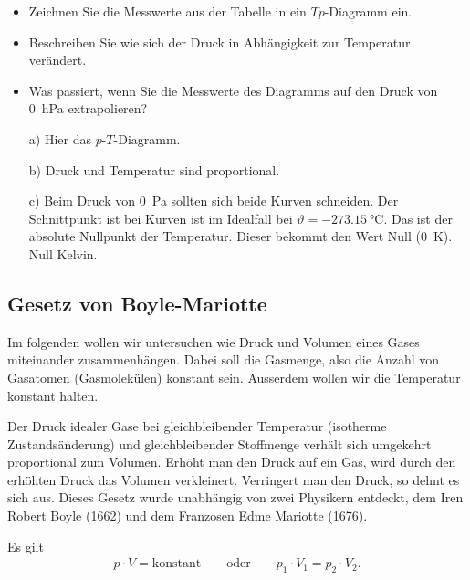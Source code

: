 \documentclass[12pt,a4paper,twoside]{article}
\begin{document}
\begin{aufgabe}
\begin{itemize}
\item Zeichnen Sie die Messwerte aus der Tabelle in ein $Tp$-Diagramm ein.
\item Beschreiben Sie wie sich der Druck in Abhängigkeit zur Temperatur verändert.
\item Was passiert, wenn Sie die Messwerte des Diagramms auf den Druck von \SI{0}{hPa} extrapolieren?
\end{itemize}
\begin{loesung}
	\begin{itemize}
		\item [a)] Hier das $p$-$T$-Diagramm.\par
	
\item [b)] Druck und Temperatur sind proportional.
\item [c)] Beim Druck von \SI{0}{Pa} sollten sich beide Kurven schneiden. Der Schnittpunkt ist bei Kurven ist im 
	Idealfall bei $\vartheta=\SI{-273.15}{\celsius}$. Das ist der absolute Nullpunkt der Temperatur. Dieser bekommt den Wert Null (\SI{0}{K}).
	Null Kelvin.
	\end{itemize}
\end{loesung}
\end{aufgabe}


\subsection*{Gesetz von Boyle-Mariotte}
Im folgenden wollen wir untersuchen wie Druck und Volumen eines Gases miteinander zusammenhängen.
Dabei soll die Gasmenge, also die Anzahl von Gasatomen (Gasmolekülen) konstant sein.
Ausserdem wollen wir die Temperatur konstant halten.

Der Druck idealer Gase bei gleichbleibender Temperatur (isotherme Zustandsänderung) 
und gleichbleibender Stoffmenge verhält sich umgekehrt proportional zum Volumen.
Erhöht man den Druck auf ein Gas, wird durch den erhöhten Druck das Volumen verkleinert.
Verringert man den Druck, so dehnt es sich aus.
Dieses Gesetz wurde unabhängig von zwei Physikern entdeckt, dem Iren Robert Boyle (1662) und dem Franzosen Edme Mariotte (1676).

Es gilt
\begin{eqnarray*}
	p\cdot V = \text{konstant} \qquad \text{oder} \qquad p_1\cdot V_1 = p_2\cdot V_2\text{.}
\end{eqnarray*}
\end{document}
